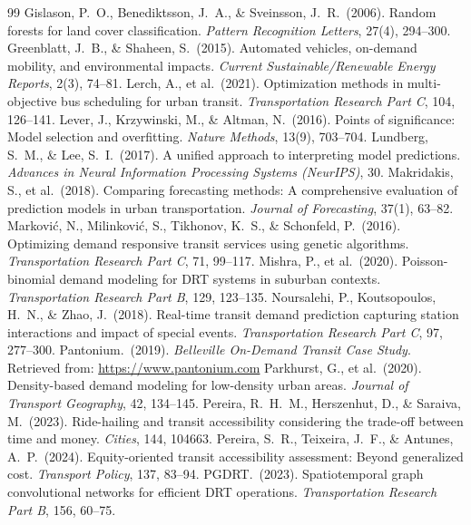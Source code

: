 \documentclass[12pt]{article}
\begin{document}
\begin{thebibliography}{99}
 Gislason, P.\ O., Benediktsson, J.\ A., \& Sveinsson, J.\ R.\ (2006). Random forests for land cover classification. \textit{Pattern Recognition Letters}, 27(4), 294--300.
 Greenblatt, J.\ B., \& Shaheen, S.\ (2015). Automated vehicles, on-demand mobility, and environmental impacts. \textit{Current Sustainable/Renewable Energy Reports}, 2(3), 74--81.
 Lerch, A., et al.\ (2021). Optimization methods in multi-objective bus scheduling for urban transit. \textit{Transportation Research Part C}, 104, 126--141.
 Lever, J., Krzywinski, M., \& Altman, N.\ (2016). Points of significance: Model selection and overfitting. \textit{Nature Methods}, 13(9), 703--704.
 Lundberg, S.\ M., \& Lee, S.\ I.\ (2017). A unified approach to interpreting model predictions. \textit{Advances in Neural Information Processing Systems (NeurIPS)}, 30.
 Makridakis, S., et al.\ (2018). Comparing forecasting methods: A comprehensive evaluation of prediction models in urban transportation. \textit{Journal of Forecasting}, 37(1), 63--82.
 Markovi\'c, N., Milinkovi\'c, S., Tikhonov, K.\ S., \& Schonfeld, P.\ (2016). Optimizing demand responsive transit services using genetic algorithms. \textit{Transportation Research Part C}, 71, 99--117.
 Mishra, P., et al.\ (2020). Poisson-binomial demand modeling for DRT systems in suburban contexts. \textit{Transportation Research Part B}, 129, 123--135.
 Noursalehi, P., Koutsopoulos, H.\ N., \& Zhao, J.\ (2018). Real-time transit demand prediction capturing station interactions and impact of special events. \textit{Transportation Research Part C}, 97, 277--300.
 Pantonium.\ (2019). \textit{Belleville On-Demand Transit Case Study}. Retrieved from: \url{https://www.pantonium.com}
 Parkhurst, G., et al.\ (2020). Density-based demand modeling for low-density urban areas. \textit{Journal of Transport Geography}, 42, 134--145.
 Pereira, R.\ H.\ M., Herszenhut, D., \& Saraiva, M.\ (2023). Ride-hailing and transit accessibility considering the trade-off between time and money. \textit{Cities}, 144, 104663.
 Pereira, S.\ R., Teixeira, J.\ F., \& Antunes, A.\ P.\ (2024). Equity-oriented transit accessibility assessment: Beyond generalized cost. \textit{Transport Policy}, 137, 83--94.
 PGDRT.\ (2023). Spatiotemporal graph convolutional networks for efficient DRT operations. \textit{Transportation Research Part B}, 156, 60--75.

\end{thebibliography}
\end{document}
